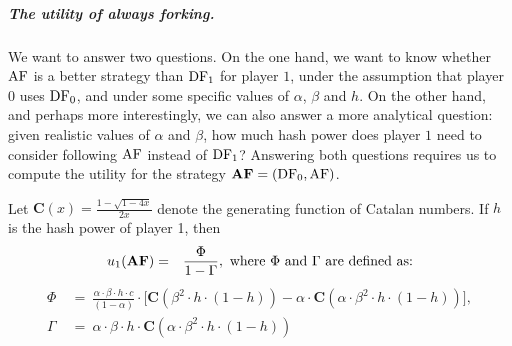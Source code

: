 \documentclass[a4paper,english,cleveref, autoref,numberwithinsect]{lipics-v2019}
\newcommand{\df}{\text{\rm DF}}
\newcommand{\bdf}{\text{\rm {\bf DF}}}
\newcommand{\af}{\text{\rm AF}}
\newcommand{\baf}{\text{\rm {\bf AF}}}
\newcommand{\cat}{\mathbf{C}}
\begin{document}
\subparagraph*{The utility of always forking.}
We want to answer two questions. 
On the one hand, we want to know whether $\af$ is a better strategy than $\df_1$ for player $1$, under the assumption that player $0$ uses $\df_0$, and under some specific values of $\alpha$, $\beta$ and $h$. 
On the other hand, and 
perhaps more interestingly, we can also answer a more analytical question: given realistic values of $\alpha$ and $\beta$, how much hash power does player $1$ need to consider following $\af$ instead of $\df_1$? 
Answering both questions requires us to compute the utility for the strategy $\baf=(\df_0,\af)$. 

\begin{theorem}\label{thm:always_fork}
Let $\cat(x) = \frac{1-\sqrt{1-4x}}{2x}$ denote the generating function of Catalan numbers.  If $h$ is the hash power of player 1, then
\begin{eqnarray*}
u_1(\baf) &=& \frac{\Phi}{1-\Gamma}, \mbox{ where $\Phi$ and $\Gamma$ are defined as:} 
\end{eqnarray*}
\vspace{-14pt}
{\small
\begin{align*}
\Phi & \ = \ \frac{\alpha \cdot \beta \cdot h \cdot c}{(1-\alpha)} \cdot \big[\cat(\beta^2 \cdot h \cdot (1-h)) - \alpha\cdot \cat(\alpha \cdot \beta^2 \cdot h \cdot (1-h))\big],\\
\Gamma & \ = \ \alpha \cdot \beta \cdot h \cdot \cat(\alpha\cdot \beta^2 \cdot h \cdot (1-h))
\end{align*}
}
\end{theorem}

\end{document}

